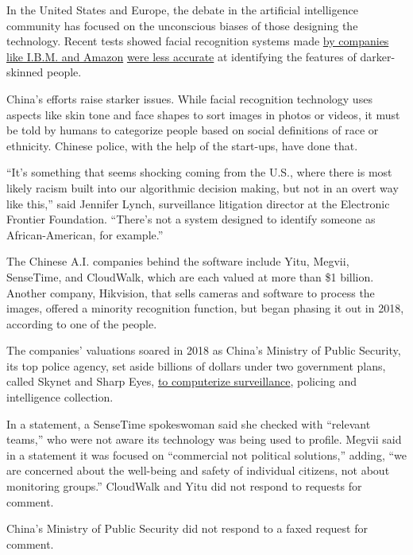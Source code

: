 In the United States and Europe, the debate in the artificial
intelligence community has focused on the unconscious biases of those
designing the technology. Recent tests showed facial recognition systems
made
\href{https://www.nytimes3xbfgragh.onion/2019/04/03/technology/amazon-facial-recognition-technology.html}{by
companies like I.B.M. and Amazon}
\href{https://www.nytimes3xbfgragh.onion/2019/01/24/technology/amazon-facial-technology-study.html}{were
less accurate} at identifying the features of darker-skinned people.

China's efforts raise starker issues. While facial recognition
technology uses aspects like skin tone and face shapes to sort images in
photos or videos, it must be told by humans to categorize people based
on social definitions of race or ethnicity. Chinese police, with the
help of the start-ups, have done that.

``It's something that seems shocking coming from the U.S., where there
is most likely racism built into our algorithmic decision making, but
not in an overt way like this,'' said Jennifer Lynch, surveillance
litigation director at the Electronic Frontier Foundation. ``There's not
a system designed to identify someone as African-American, for
example.''

The Chinese A.I. companies behind the software include Yitu, Megvii,
SenseTime, and CloudWalk, which are each valued at more than \$1
billion. Another company, Hikvision, that sells cameras and software to
process the images, offered a minority recognition function, but began
phasing it out in 2018, according to one of the people.

The companies' valuations soared in 2018 as China's Ministry of Public
Security, its top police agency, set aside billions of dollars under two
government plans, called Skynet and Sharp Eyes,
\href{https://www.nytimes3xbfgragh.onion/2018/07/08/business/china-surveillance-technology.html}{to
computerize surveillance}, policing and intelligence collection.

In a statement, a SenseTime spokeswoman said she checked with ``relevant
teams,'' who were not aware its technology was being used to profile.
Megvii said in a statement it was focused on ``commercial not political
solutions,'' adding, ``we are concerned about the well-being and safety
of individual citizens, not about monitoring groups.'' CloudWalk and
Yitu did not respond to requests for comment.

China's Ministry of Public Security did not respond to a faxed request
for comment.

